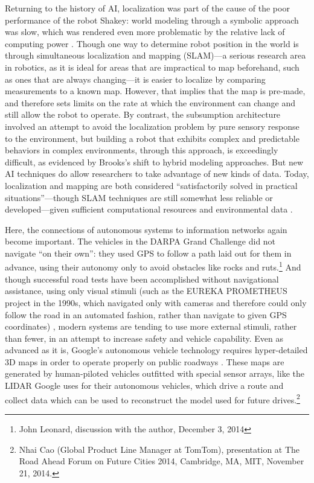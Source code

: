 Returning to the history of AI,
localization was part of the cause of the poor performance of the
robot Shakey: world modeling through a symbolic approach was slow,
which was rendered even more problematic by the relative lack of
computing power \cite[Afterword]{mccorduck}.
Though one way to determine robot position in the world is through
simultaneous localization and mapping (SLAM)---a serious research area in
robotics, as it is ideal for areas that are impractical to map
beforehand, such as ones that are always changing---it is easier to localize by comparing
measurements to a known map. However, that implies that the map is
pre-made, and therefore sets limits on the rate at which the
environment can change and still allow the robot to operate. By
contrast, the subsumption architecture involved an
attempt to avoid the localization problem by pure sensory response to
the environment, but building a robot that exhibits complex and
predictable behaviors in complex environments, through this approach,
is exceedingly difficult, as evidenced by Brooks's shift to hybrid
modeling approaches. But new AI techniques do allow researchers to
take advantage of new kinds of data. Today, localization and
mapping are both considered ``satisfactorily solved in practical
situations''---though SLAM techniques
are still somewhat less reliable or developed---given sufficient
computational resources and environmental data \cite[p.
  5-6]{SLAMbook}.


Here, the connections of autonomous systems to information networks
again become important. The vehicles in the
DARPA Grand Challenge did not navigate ``on their own'': they used GPS
to follow a path laid out for them in advance, using their autonomy
only to avoid obstacles like rocks and ruts.\footnote{John Leonard,
  discussion with the author, December 3, 2014} And though successful
road tests have been accomplished without navigational assistance,
using only visual stimuli (such as the EUREKA PROMETHEUS project
in the 1990s, which navigated only with cameras and therefore could
only follow the road in an automated fashion, rather than navigate to
given GPS coordinates) \cite{ulmerVITA}, modern systems are tending to use more external
stimuli, rather than fewer, in an attempt to increase safety and
vehicle capability. Even as
advanced as it is, Google's autonomous vehicle technology requires
hyper-detailed 3D maps in order to operate properly on public
roadways \cite{gomesObstacles}. These maps are generated by human-piloted vehicles outfitted with
special sensor arrays, like the LIDAR Google uses for their autonomous
vehicles, which drive a route and collect data which can be used to
reconstruct the model used for future drives.\footnote{Nhai Cao
  (Global Product Line Manager at TomTom), presentation at The Road
  Ahead Forum on Future Cities 2014, Cambridge, MA, MIT, November 21, 2014.} 

